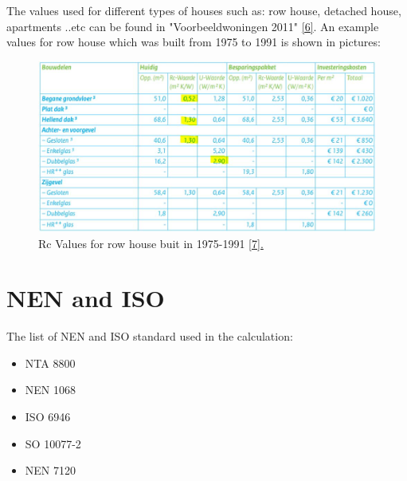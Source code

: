 \documentclass[a4paper,10pt]{article}
\begin{document}
The values used for different types of houses such as: row house, detached house, apartments ..etc can be found in "Voorbeeldwoningen 2011" \href{https://www.rvo.nl/onderwerpen/duurzaam-ondernemen/gebouwen/woningbouw/particuliere-woningen/voorbeeldwoningen}{[6]}. An example values for row house which was built from 1975 to 1991 is shown in pictures:


	
\begin{figure}[H]
	\centering
	\includegraphics[width=0.8\columnwidth]{Pictures/row_house_1975-1991.JPG}
	\caption[Short title]{Rc Values for row house buit in 1975-1991 \href{Voorbeeldwoningen 2011 bestaande bouw.pdf}{[7].}}
	\label{row house}
	\end{figure} 


\section{NEN and ISO}

The list of NEN and ISO standard used in the calculation:

\begin{itemize}
    \item NTA 8800
    \item NEN 1068
    \item ISO 6946
    \item SO 10077-2
    \item NEN 7120
\end{itemize}

\end{document}
